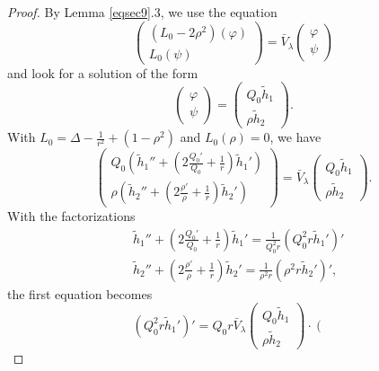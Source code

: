 \documentclass[11 pt]{amsart}
\theoremstyle{definition}
\theoremstyle{remark}
\numberwithin{equation}{section}
\begin{document}
\begin{proof}
  By Lemma \ref{eqsec9}.3, we use the equation
  \[ \left(\begin{array}{c}
       (L_0 - 2 \rho^2) (\varphi)\\
       L_0 (\psi)
     \end{array}\right) = \bar{V}_{\lambda} \left(\begin{array}{c}
       \varphi\\
       \psi
     \end{array}\right) \]
  and look for a solution of the form
  \[ \left(\begin{array}{c}
       \varphi\\
       \psi
     \end{array}\right) = \left(\begin{array}{c}
       Q_0 \widetilde{h}_1\\
       \rho \widetilde{h}_2
     \end{array}\right) . \]
  With $L_0 = \Delta - \frac{1}{r^2} + (1 - \rho^2)$ and $L_0 (\rho) = 0$, we
  have
  \[ \left(\begin{array}{c}
       Q_0 \left( \widetilde{h}_1'' + \left( 2 \frac{Q_0'}{Q_0} + \frac{1}{r}
       \right) \widetilde{h}_1' \right)\\
       \rho \left( \widetilde{h}_2'' + \left( 2 \frac{\rho'}{\rho} + \frac{1}{r}
       \right) \widetilde{h}_2' \right)
     \end{array}\right) = \bar{V}_{\lambda} \left(\begin{array}{c}
       Q_0 \widetilde{h}_1\\
       \rho \widetilde{h}_2
     \end{array}\right) . \]
  With the factorizations
\begin{align*}
& \widetilde{h}_1'' + \left( 2 \frac{Q_0'}{Q_0} + \frac{1}{r} \right)
     \widetilde{h}_1' = \frac{1}{Q_0^2 r} (Q_0^2 r \widetilde{h}_1')' \\
& \widetilde{h}_2'' + \left( 2 \frac{\rho'}{\rho} + \frac{1}{r} \right)
     \widetilde{h}_2' = \frac{1}{\rho^2 r} (\rho^2 r \widetilde{h}_2')',
\end{align*}
the first equation becomes
  \[ (Q_0^2 r \widetilde{h}_1')' = Q_0 r \bar{V}_{\lambda} \left(\begin{array}{c}
       Q_0 \widetilde{h}_1\\
       \rho \widetilde{h}_2
     \end{array}\right) \cdot \left(\begin{array}{c}

\end{array}\]
\end{proof}
\end{document}
